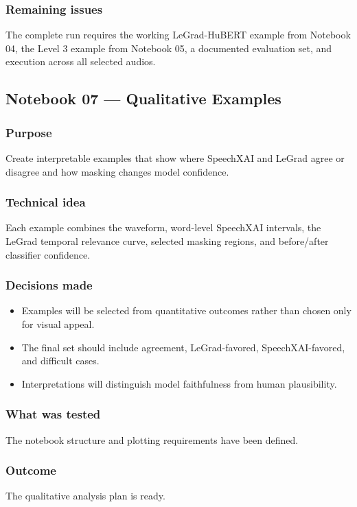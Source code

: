 \documentclass[11pt]{article}
\begin{document}
\subsubsection*{Remaining issues}
The complete run requires the working LeGrad-HuBERT example from Notebook 04,
the Level 3 example from Notebook 05, a documented evaluation set, and execution
across all selected audios.

\subsection{Notebook 07 --- Qualitative Examples}

\subsubsection*{Purpose}
Create interpretable examples that show where SpeechXAI and LeGrad agree or disagree and how masking changes model confidence.

\subsubsection*{Technical idea}
Each example combines the waveform, word-level SpeechXAI intervals, the LeGrad temporal relevance curve, selected masking regions, and before/after classifier confidence.

\subsubsection*{Decisions made}
\begin{itemize}
  \item Examples will be selected from quantitative outcomes rather than chosen only for visual appeal.
  \item The final set should include agreement, LeGrad-favored, SpeechXAI-favored, and difficult cases.
  \item Interpretations will distinguish model faithfulness from human plausibility.
\end{itemize}

\subsubsection*{What was tested}
The notebook structure and plotting requirements have been defined.

\subsubsection*{Outcome}
The qualitative analysis plan is ready.
\end{document}
